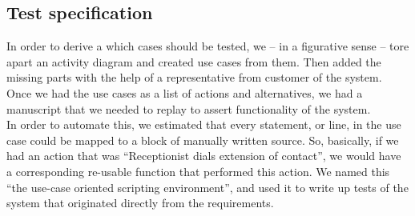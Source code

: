 \subsection{Test specification}
In order to derive a which cases should be tested, we -- in a figurative sense --  tore apart an activity diagram and created use cases from them. Then added the missing parts with the help of a representative from customer of the system. Once we had the use cases as a list of actions and alternatives, we had a manuscript that we needed to replay to assert functionality of the system.\\
In order to automate this, we estimated that every statement, or line, in the use case could be mapped to a block of manually written source. So, basically, if we had an action that was ``Receptionist dials extension of contact'', we would have a corresponding re-usable function that performed this action. We named this ``the use-case oriented scripting environment'', and used it to write up tests of the system that originated directly from the requirements.

